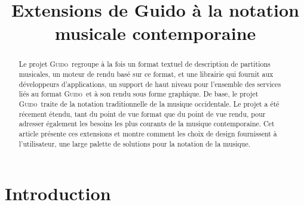 \documentclass{article}
\title{\centering Extensions de Guido à la notation musicale contemporaine}
\newcommand{\guido}			{\textsc{Guido}}
\begin{document}

\maketitle

\begin{abstract}

Le projet \guido\ regroupe à la fois un format textuel de description de partitions musicales, un moteur de rendu basé sur ce format, et une librairie qui fournit aux développeurs d'applications, un support de haut niveau pour l'ensemble des services liés au format \guido\ et à son rendu sous forme graphique. 
De base, le projet \guido\ traite de la notation traditionnelle de la musique occidentale. Le projet a été récement étendu, tant du point de vue format que du point de vue rendu, pour adresser également les besoins les plus courants de la musique contemporaine. Cet article présente ces extensions et montre comment les choix de design fournissent à l'utilisateur, une large palette de solutions pour la notation de la musique. 


\end{abstract}


\section{Introduction}\label{sec:introduction}

% 
\end{document}
